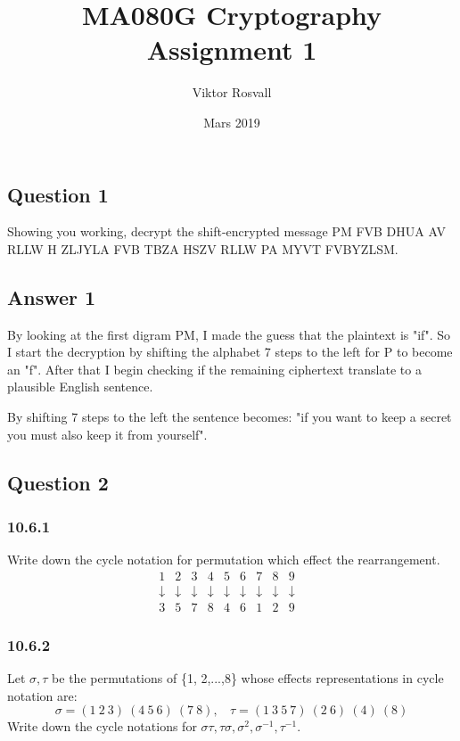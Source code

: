 \documentclass{article}
\title{MA080G Cryptography Assignment 1}
\author{Viktor Rosvall}
\date{Mars 2019}
\begin{document}
	\maketitle
	\subsection*{Question 1}
	Showing you working, decrypt the shift-encrypted message
	PM FVB DHUA AV RLLW H ZLJYLA FVB TBZA HSZV RLLW PA MYVT
	FVBYZLSM.
	
	\subsection*{Answer 1}
	By looking at the first digram PM, I made the guess that the plaintext is "if". So I start the decryption by shifting the alphabet 7 steps to the left for P to become an "f". After that I begin checking if the remaining ciphertext translate to a  plausible English sentence. 
	
	By shifting 7 steps to the left the sentence becomes: "if you want to keep a secret you must also keep it from yourself".
	
	\subsection*{Question 2}
	\subsubsection*{10.6.1}
	Write down the cycle notation for permutation which effect the rearrangement.
	\[
	\begin{matrix}
		1 & 2 & 3 & 4 & 5 & 6 & 7 & 8 & 9 \\
		\downarrow & \downarrow & \downarrow & \downarrow & \downarrow & \downarrow & \downarrow & \downarrow & \downarrow & \\
		3 & 5 & 7 & 8 & 4 & 6 & 1 & 2 & 9
	\end{matrix}
	\]
	
	\subsubsection*{10.6.2}
	Let $\sigma, \tau$ be the permutations of \{1, 2,...,8\} whose effects representations in cycle notation are: 
	$$\sigma = (1 \ 2 \ 3) \ (4 \ 5 \ 6) \ (7 \ 8), \ \ \ \ \tau = (1 \ 3 \ 5 \ 7) \ (2 \ 6) \ (4) \ (8)$$
	Write down the cycle notations for $\sigma\tau,\tau\sigma,\sigma^2,\sigma^{-1},\tau^{-1}$.
	
\end{document}
